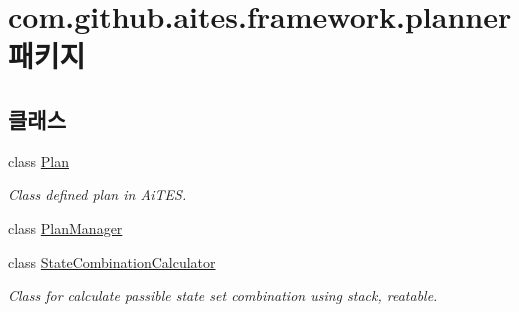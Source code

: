 \hypertarget{namespacecom_1_1github_1_1aites_1_1framework_1_1planner}{}\section{com.\+github.\+aites.\+framework.\+planner 패키지}
\label{namespacecom_1_1github_1_1aites_1_1framework_1_1planner}
\subsection*{클래스}
\begin{DoxyCompactItemize}
\item 
class \mbox{\hyperlink{classcom_1_1github_1_1aites_1_1framework_1_1planner_1_1_plan}{Plan}}
\begin{DoxyCompactList}\small\item\em Class defined plan in Ai\+T\+ES. \end{DoxyCompactList}\item 
class \mbox{\hyperlink{classcom_1_1github_1_1aites_1_1framework_1_1planner_1_1_plan_manager}{Plan\+Manager}}
\item 
class \mbox{\hyperlink{classcom_1_1github_1_1aites_1_1framework_1_1planner_1_1_state_combination_calculator}{State\+Combination\+Calculator}}
\begin{DoxyCompactList}\small\item\em Class for calculate passible state set combination using stack, reatable. \end{DoxyCompactList}\end{DoxyCompactItemize}
